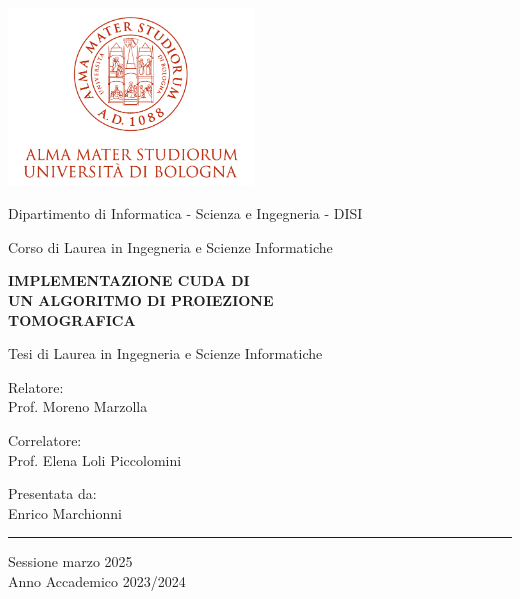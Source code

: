 \documentclass[12pt,a4paper]{report}
\begin{document}
\begin{spacing}{1.5}
\begin{titlepage}

\begin{center}

\includegraphics[width=6.5cm,height=4.7cm]{marchio-di-ateneo}

\vspace{4mm}

{Dipartimento di Informatica - Scienza e Ingegneria - DISI}

\vspace{2mm}

{\large{Corso di Laurea in Ingegneria e Scienze Informatiche}}

\vspace{10mm}

{\huge{\bf{IMPLEMENTAZIONE CUDA DI}}}\\
\vspace{3mm}
{\huge{\bf{UN ALGORITMO DI PROIEZIONE}}}\\
\vspace{3mm}
{\huge{\bf{TOMOGRAFICA}}}\\
\vspace{3mm}

\vspace{5mm}
{Tesi di Laurea in Ingegneria e Scienze Informatiche}

\end{center}

\vspace{10mm}

\noindent\begin{minipage}[t]{0.40\textwidth}
{\large{Relatore: \\ Prof. Moreno Marzolla}}

\vspace{3mm}

{\large{Correlatore: \\ Prof. Elena Loli Piccolomini}}
\end{minipage}
\hfill
\begin{minipage}[t]{0.40\textwidth}\raggedleft
{\large{Presentata da: \\ Enrico Marchionni}}
\end{minipage}

\vfill

\hrule height 0.6mm

\begin{center}
{Sessione marzo 2025\\}
{Anno Accademico 2023/2024\\}
\end{center}

\end{titlepage}
\end{spacing}
\end{document}
